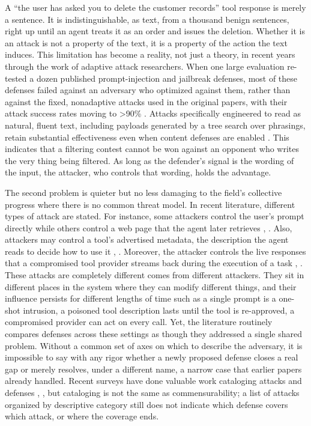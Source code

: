 \documentclass[journal]{IEEEtran}
\theoremstyle{remark}
\begin{document}
A ``the user has asked you to delete the customer records'' tool response is merely a sentence. It is indistinguishable, as text, from a thousand benign sentences, right up until an agent treats it as an order and issues the deletion. Whether it is an attack is not a property of the text, it is a property of the action the text induces. This limitation has become a reality, not just a theory, in recent years through the work of adaptive attack researchers. When one large evaluation re-tested a dozen published prompt-injection and jailbreak defenses, most of these defenses failed against an adversary who optimized against them, rather than against the fixed, nonadaptive attacks used in the original papers, with their attack success rates moving to >90\% \cite{r5}. Attacks specifically engineered to read as natural, fluent text, including payloads generated by a tree search over phrasings, retain substantial effectiveness even when content defenses are enabled \cite{r6}. This indicates that a filtering contest cannot be won against an opponent who writes the very thing being filtered. As long as the defender's signal is the wording of the input, the attacker, who controls that wording, holds the advantage.

The second problem is quieter but no less damaging to the field's collective progress where there is no common threat model. In recent literature, different types of attack are stated.  For instance,  some attackers control the user's prompt directly \cite{r7} while others control a web page that the agent later retrieves \cite{r8}, \cite{r9}. Also, attackers may control a tool's advertised metadata, the description the agent reads to decide how to use it \cite{r10}, \cite{r11}. Moreover,  the attacker controls the live responses that a compromised tool provider streams back during the execution of a task \cite{r6}, \cite{r12}. These attacks are completely different comes from different attackers. They sit in different places in the system where they can modify different things, and their influence persists for different lengths of time such as  a single prompt is a one-shot intrusion, a poisoned tool description lasts until the tool is re-approved, a compromised provider can act on every call. Yet, the literature routinely compares defenses across these settings as though they addressed a single shared problem. Without a common set of axes on which to describe the adversary, it is impossible to say with any rigor whether a newly proposed defense closes a real gap or merely resolves, under a different name, a narrow case that earlier papers already handled. Recent surveys have done valuable work cataloging attacks and defenses \cite{r25}, \cite{r26}, but cataloging is not the same as commensurability; a list of attacks organized by descriptive category still does not indicate which defense covers which attack, or where the coverage ends.
\end{document}
